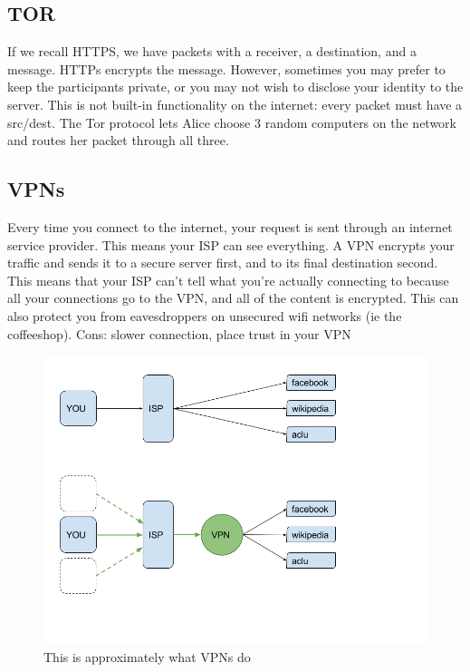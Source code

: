 \documentclass{article}
\newcommand{\todo}[1]{{\color{red}{\textbf{\em [TODO: #1]}}}}
\begin{document}
\subsection{TOR}
If we recall HTTPS, we have packets with a receiver, a destination, and a message. HTTPs encrypts
the message. However, sometimes you may prefer to keep the participants private, or you may not
wish to disclose your identity to the server. This is not built-in functionality on the internet:
every packet must have a src/dest. The Tor protocol lets Alice choose 3 random computers on
the network and routes her packet through all three.  

\todo{get TOR graphic}

\subsection{VPNs}
Every time you connect to the internet, your request is sent through an internet service
provider. This means your ISP can see everything.
A VPN encrypts your traffic and sends it to a secure server first, and to its final destination
second. This means that your ISP can’t tell what you’re actually connecting to because all
your connections go to the VPN, and all of the content is encrypted. This can also protect you
from eavesdroppers on unsecured wifi networks (ie the coffeeshop).
Cons: slower connection, place trust in your VPN

\begin{figure}
\includegraphics[width=\textwidth]{vpn}
\caption{This is approximately what VPNs do}
\end{figure}
\end{document}
